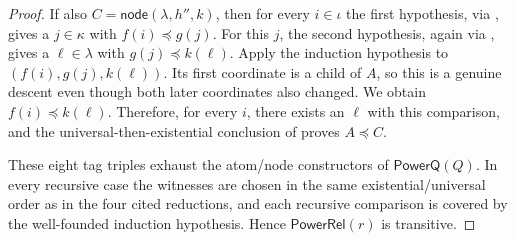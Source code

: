 \begin{proof}
If also $C=\mathsf{node}(\lambda,h'',k)$, then for every $i\in\iota$ the
first hypothesis, via , gives a $j\in\kappa$ with
$f(i)\preceq g(j)$.  For this $j$, the second hypothesis, again via
, gives a $\ell\in\lambda$ with
$g(j)\preceq k(\ell)$.  Apply the induction hypothesis to
$(f(i),g(j),k(\ell))$.  Its first coordinate is a child of $A$, so this is
a genuine descent even though both later coordinates also changed.  We
obtain $f(i)\preceq k(\ell)$.  Therefore, for every $i$, there exists an
$\ell$ with this comparison, and the universal-then-existential conclusion
of  proves $A\preceq C$.

These eight tag triples exhaust the atom/node constructors of
$\mathsf{PowerQ}(Q)$.  In every recursive case the witnesses are chosen in
the same existential/universal order as in the four cited reductions, and
each recursive comparison is covered by the well-founded induction
hypothesis.  Hence $\mathsf{PowerRel}(r)$ is transitive.
\end{proof}
